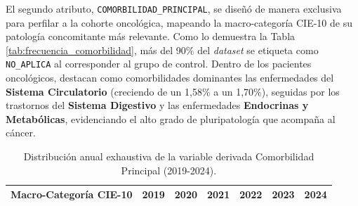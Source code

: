 El segundo atributo, \texttt{COMORBILIDAD\_PRINCIPAL}, se diseñó de manera exclusiva para perfilar a la cohorte oncológica, mapeando la macro-categoría CIE-10 de su patología concomitante más relevante. Como lo demuestra la Tabla \ref{tab:frecuencia_comorbilidad}, más del 90\% del \textit{dataset} se etiqueta como \texttt{NO\_APLICA} al corresponder al grupo de control. Dentro de los pacientes oncológicos, destacan como comorbilidades dominantes las enfermedades del \textbf{Sistema Circulatorio} (creciendo de un 1,58\% a un 1,70\%), seguidas por los trastornos del \textbf{Sistema Digestivo} y las enfermedades \textbf{Endocrinas y Metabólicas}, evidenciando el alto grado de pluripatología que acompaña al cáncer.
\begin{table}[htbp]
\centering
\scriptsize
\setlength{\tabcolsep}{2pt}
\renewcommand{\arraystretch}{1.15}
\caption{Distribución anual exhaustiva de la variable derivada Comorbilidad Principal (2019-2024).}
\label{tab:frecuencia_comorbilidad_completa}
\begin{tabular}{|l|c|c|c|c|c|c|}
\hline
\parbox[t]{3.8cm}{\textbf{Macro-Categoría CIE-10}} &
\parbox[t]{1.5cm}{\centering\textbf{2019}} &
\parbox[t]{1.5cm}{\centering\textbf{2020}} &
\parbox[t]{1.5cm}{\centering\textbf{2021}} &
\parbox[t]{1.5cm}{\centering\textbf{2022}} &
\parbox[t]{1.5cm}{\centering\textbf{2023}} &
\parbox[t]{1.5cm}{\centering\textbf{2024}} \\ \hline


\end{tabular}
\end{table}

